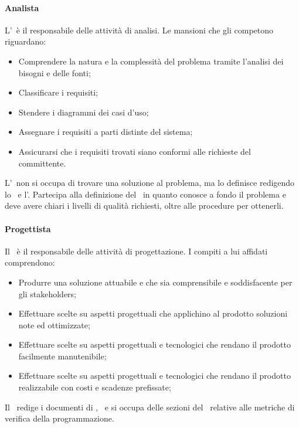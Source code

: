 \documentclass[../NormeProgetto.tex]{subfiles}
\begin{document}
			\paragraph{Analista}
			L'\analista\ è il responsabile delle attività di analisi. Le mansioni che gli competono riguardano:
			\begin{itemize}
			\item Comprendere la natura e la complessità del problema tramite l'analisi dei bisogni e delle fonti;
			\item Classificare i requisiti;
			\item Stendere i diagrammi dei casi d'uso;
			\item Assegnare i requisiti a parti distinte del sistema;
			\item Assicurarsi che i requisiti trovati siano conformi alle richieste del committente.
			\end{itemize}
			L'\analista\ non si occupa di trovare una soluzione al problema, ma lo definisce redigendo lo \studiodifattibilita\ e l'\analisideirequisiti. Partecipa alla definizione del \pianodiqualifica\ in quanto conosce a fondo il problema e deve avere chiari i livelli di qualità richiesti, oltre alle procedure per ottenerli. 
			\paragraph{Progettista}
			Il \progettista\ è il responsabile delle attività di progettazione. I compiti a lui affidati comprendono:
			\begin{itemize}
			\item Produrre una soluzione attuabile e che sia comprensibile e soddisfacente per gli stakeholders;
			\item Effettuare scelte su aspetti progettuali che applichino al prodotto soluzioni note ed ottimizzate;
			\item Effettuare scelte su aspetti progettuali e tecnologici che rendano il prodotto facilmente manutenibile;
			\item Effettuare scelte su aspetti progettuali e tecnologici che rendano il prodotto realizzabile con costi e scadenze prefissate;
			\end{itemize}
			Il \progettista\ redige i documenti di \specificatecnica, \ e si occupa delle sezioni del \pianodiqualifica\ relative alle metriche di verifica della programmazione.
\end{document}
